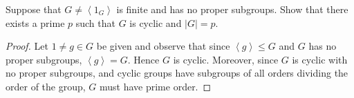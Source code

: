 \documentclass[10pt]{amsart}
\begin{document}
\begin{thm}
	Suppose that $G \not = \left< 1_G \right>$ is finite and has no proper subgroups.  Show that there exists a prime $p$ such that $G$ is cyclic and $|G| = p$.
	\begin{proof}
          Let $1 \not = g \in G$ be given and observe that since $\left< g \right> \leq G$ and $G$ has no proper subgroups, $\left< g \right> = G.$  
          Hence $G$ is cyclic.
          Moreover, since $G$ is cyclic with no proper subgroups, and cyclic groups have subgroups of all orders dividing the order of the group, $G$ must have prime order.
	\end{proof}
\end{thm}
\end{document}
